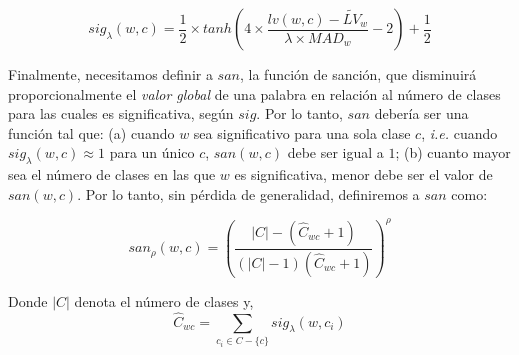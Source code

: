 \begin{equation}
    sig_{\lambda}(w, c) = \frac{1}{2}\times tanh\left(4\times\frac{lv(w, c) - \widetilde{LV}_w}{\lambda\times MAD_w} - 2\right) + \frac{1}{2}
\end{equation}

\vspace{5mm}

Finalmente, necesitamos definir a $san$, la función de sanción, que disminuirá proporcionalmente el \emph{valor global} de una palabra en relación al número de clases para las cuales es significativa, según $sig$. Por lo tanto, $san$ debería ser una función tal que: (a) cuando $w$ sea significativo para una sola clase $c$, \emph{i.e.} cuando $sig_{\lambda} (w, c)\approx 1$ para un único $c$,  $san(w , c)$ debe ser igual a $1$; (b) cuanto mayor sea el número de clases en las que $w$ es significativa, menor debe ser el valor de $san(w, c)$. Por lo tanto, sin pérdida de generalidad, definiremos a $san$ como:

\begin{equation}
\label{eq:san}
    san_\rho(w, c) = \left(\frac
        {|C| - \left(\hat{C}_{wc} + 1\right)}
        {\left(|C|-1\right)\left(\hat{C}_{wc} + 1\right)}
    \right)^\rho
\end{equation}




Donde $|C|$ denota el número de clases y, 
$$\hat{C}_{wc} = \sum_{c_i\in C-\{c\}}sig_{\lambda}(w, c_i)$$


